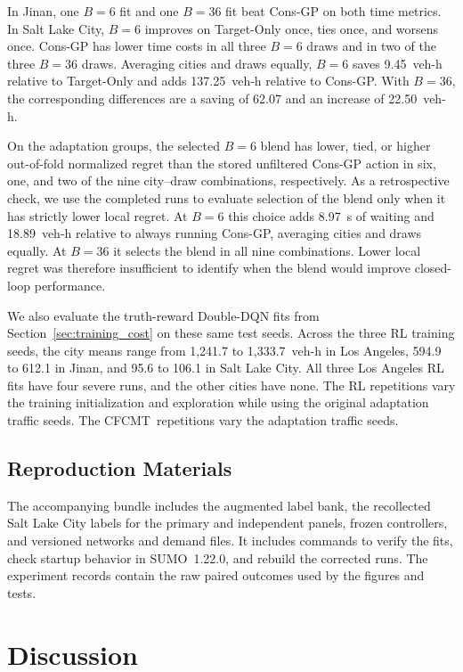 \documentclass[letterpaper,journal]{IEEEtran}
\newcommand{\method}{CFCMT}
\begin{document}
In Jinan, one $B=6$ fit and one $B=36$ fit beat Cons-GP on both time metrics. In Salt Lake City, $B=6$ improves on Target-Only once, ties once, and worsens once. Cons-GP has lower time costs in all three $B=6$ draws and in two of the three $B=36$ draws. Averaging cities and draws equally, $B=6$ saves 9.45~veh-h relative to Target-Only and adds 137.25~veh-h relative to Cons-GP. With $B=36$, the corresponding differences are a saving of 62.07 and an increase of 22.50~veh-h.

On the adaptation groups, the selected $B=6$ blend has lower, tied, or higher out-of-fold normalized regret than the stored unfiltered Cons-GP action in six, one, and two of the nine city--draw combinations, respectively. As a retrospective check, we use the completed runs to evaluate selection of the blend only when it has strictly lower local regret. At $B=6$ this choice adds 8.97~s of waiting and 18.89~veh-h relative to always running Cons-GP, averaging cities and draws equally. At $B=36$ it selects the blend in all nine combinations. Lower local regret was therefore insufficient to identify when the blend would improve closed-loop performance.

We also evaluate the truth-reward Double-DQN fits from Section~\ref{sec:training_cost} on these same test seeds. Across the three RL training seeds, the city means range from 1,241.7 to 1,333.7~veh-h in Los Angeles, 594.9 to 612.1 in Jinan, and 95.6 to 106.1 in Salt Lake City. All three Los Angeles RL fits have four severe runs, and the other cities have none. The RL repetitions vary the training initialization and exploration while using the original adaptation traffic seeds. The \method\ repetitions vary the adaptation traffic seeds.

\subsection{Reproduction Materials}
The accompanying bundle includes the augmented label bank, the recollected Salt Lake City labels for the primary and independent panels, frozen controllers, and versioned networks and demand files. It includes commands to verify the fits, check startup behavior in SUMO~1.22.0, and rebuild the corrected runs. The experiment records contain the raw paired outcomes used by the figures and tests.

\section{Discussion}
\label{sec:discussion}
\end{document}
